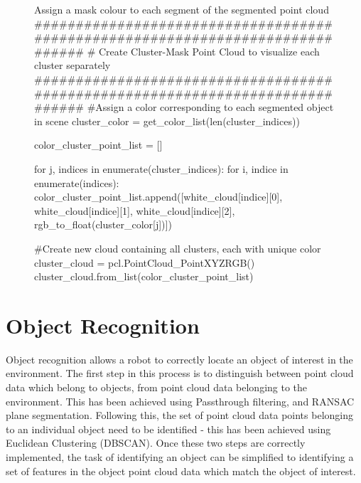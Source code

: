 \documentclass[a4paper]{article}
\begin{document}
\begin{figure}[h]\scriptsize
\begin{sexylisting}{Assign a mask colour to each segment of the segmented point cloud}
##############################################################################
    # Create Cluster-Mask Point Cloud to visualize each cluster separately
##############################################################################
    #Assign a color corresponding to each segmented object in scene
    cluster_color = get_color_list(len(cluster_indices))

    color_cluster_point_list = []

    for j, indices in enumerate(cluster_indices):
        for i, indice in enumerate(indices):
            color_cluster_point_list.append([white_cloud[indice][0],
                                            white_cloud[indice][1],
                                            white_cloud[indice][2],
                                            rgb_to_float(cluster_color[j])])

    #Create new cloud containing all clusters, each with unique color
    cluster_cloud = pcl.PointCloud_PointXYZRGB()
    cluster_cloud.from_list(color_cluster_point_list)
\end{sexylisting}
\end{figure}


\section{Object Recognition}
Object recognition allows a robot to correctly locate an object of interest in the environment. The first step in this process is to distinguish between point cloud data which belong to objects, from point cloud data belonging to the environment. This has been achieved using Passthrough filtering, and RANSAC plane segmentation. Following this, the set of point cloud data points belonging to an individual object need to be identified - this has been achieved using Euclidean Clustering (DBSCAN). Once these two steps are correctly implemented, the task of identifying an object can be simplified to identifying a set of features in the object point cloud data which  match the object of interest.\\
\end{document}
